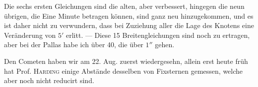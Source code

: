 \par\indent Die sechs ersten Gleichungen sind die alten, aber verbessert, hingegen die neun übrigen, die Eine Minute betragen können, sind ganz neu hinzugekommen, und es ist daher nicht zu verwundern, dass bei Zuziehung aller die Lage des Knotens eine Veränderung von $5'$ erlitt. — Diese 15 Breitengleichungen sind noch zu ertragen, aber bei der Pallas habe ich über 40, die über $1''$ gehen.\par
\indent Den Cometen haben wir am 22. Aug. zuerst wiedergesehn, allein erst heute früh hat Prof. \textsc{Harding} einige Abstände desselben von Fixsternen gemessen, welche aber noch nicht reducirt sind.
